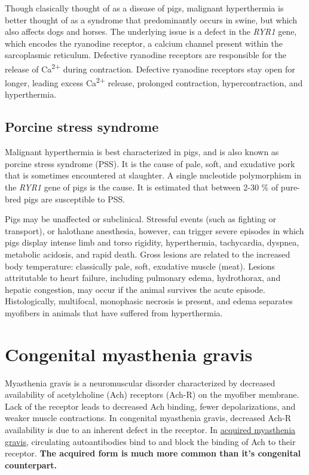 \documentclass[openany]{book}
\begin{document}
Though clasically thought of as a disease of pigs, malignant
hyperthermia is better thought of as a syndrome that predominantly
occurs in swine, but which also affects dogs and horses. The underlying
issue is a defect in the \emph{RYR1} gene, which encodes the ryanodine
receptor, a calcium channel present within the sarcoplasmic reticulum.
Defective ryanodine receptors are responsible for the release of
Ca\textsuperscript{2+} during contraction. Defective ryanodine receptors
stay open for longer, leading excess Ca\textsuperscript{2+} release,
prolonged contraction, hypercontraction, and hyperthermia.

\subsection{Porcine stress syndrome}\label{porcine-stress-syndrome}

Malignant hyperthermia is best characterized in pigs, and is also known
as porcine stress syndrome (PSS). It is the cause of pale, soft, and
exudative pork that is sometimes encountered at slaughter. A single
nucleotide polymorphism in the \emph{RYR1} gene of pigs is the cause. It
is estimated that between 2-30 \% of pure-bred pigs are susceptible to
PSS.

Pigs may be unaffected or subclinical. Stressful events (such as
fighting or transport), or halothane anesthesia, however, can trigger
severe episodes in which pigs display intense limb and torso rigidity,
hyperthermia, tachycardia, dyspnea, metabolic acidosis, and rapid death.
Gross lesions are related to the increased body temperature: classically
pale, soft, exudative muscle (meat). Lesions attritutable to heart
failure, including pulmonary edema, hydrothorax, and hepatic congestion,
may occur if the animal survives the acute episode. Histologically,
multifocal, monophasic necrosis is present, and edema separates
myofibers in animals that have suffered from hyperthermia.

\hypertarget{congenital-myasthenia-gravis}{\section{Congenital
myasthenia gravis}\label{congenital-myasthenia-gravis}}

Myasthenia gravis is a neuromuscular disorder characterized by decreased
availability of acetylcholine (Ach) receptors (Ach-R) on the myofiber
membrane. Lack of the receptor leads to decreased Ach binding, fewer
depolarizations, and weaker muscle contractions. In congenital
myasthenia gravis, decreased Ach-R availability is due to an inherent
defect in the receptor. In
\protect\hyperlink{acquired-myasthenia-gravis}{acquired myasthenia
gravis}, circulating autoantibodies bind to and block the binding of Ach
to their receptor. \textbf{The acquired form is much more common than
it's congenital counterpart.}
\end{document}
